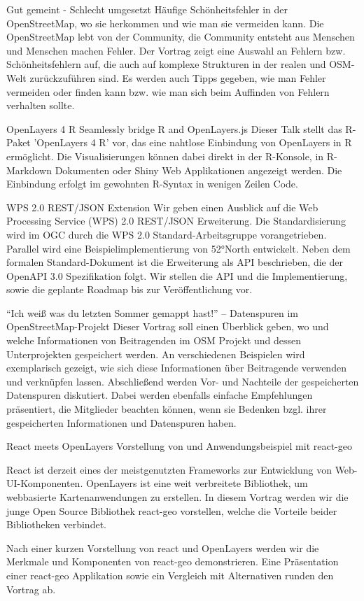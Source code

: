 
%
{Gut gemeint - Schlecht umgesetzt}%
{Häufige Schönheitsfehler in der OpenStreetMap, wo sie herkommen und wie man sie vermeiden kann.}%
{%
Die OpenStreetMap lebt von der Community, die Community entsteht aus Menschen und Menschen machen Fehler. Der Vortrag zeigt eine Auswahl an Fehlern bzw. Schönheitsfehlern auf, die auch auf komplexe Strukturen in der realen und OSM-Welt zurückzuführen sind. Es werden auch Tipps gegeben, wie man Fehler vermeiden oder finden kann bzw. wie man sich beim Auffinden von Fehlern verhalten sollte.%
}

%
{OpenLayers 4 R}%
{Seamlessly bridge R and OpenLayers.js}%
{%
Dieser Talk stellt das R-Paket 'OpenLayers 4 R' vor, das eine nahtlose Einbindung von OpenLayers in R ermöglicht. Die Visualisierungen können dabei direkt in der R-Konsole, in R-Markdown Dokumenten oder Shiny Web Applikationen angezeigt werden. Die Einbindung erfolgt im gewohnten R-Syntax in wenigen Zeilen Code.%
}

%
{WPS 2.0 REST/JSON Extension}%
{}%
{%
Wir geben einen Ausblick auf die Web Processing Service (WPS) 2.0 REST/JSON Erweiterung. Die Standardisierung wird im OGC durch die WPS 2.0 Standard-Arbeitsgruppe vorangetrieben. Parallel wird eine Beispielimplementierung von 52°North entwickelt. Neben dem formalen Standard-Dokument ist die Erweiterung als API beschrieben, die der OpenAPI 3.0 Spezifikation folgt. Wir stellen die API und die Implementierung, sowie die geplante Roadmap bis zur Veröffentlichung vor.%
}

%
{"`Ich weiß was du letzten Sommer gemappt hast!"' -- Datenspuren im OpenStreetMap-Projekt}%
{}%
{%
Dieser Vortrag soll einen Überblick geben, wo und welche Informationen von Beitragenden im OSM Projekt und dessen Unterprojekten gespeichert werden. An verschiedenen Beispielen wird exemplarisch gezeigt, wie sich diese Informationen über Beitragende verwenden und verknüpfen lassen. Abschließend werden Vor- und Nachteile der gespeicherten Datenspuren diskutiert. Dabei werden ebenfalls einfache Empfehlungen präsentiert, die Mitglieder beachten können, wenn sie Bedenken bzgl. ihrer gespeicherten Informationen und Datenspuren haben.%
}

%
{React meets OpenLayers}%
{Vorstellung von und Anwendungsbeispiel mit react-geo}%
{%
React ist derzeit eines der meistgenutzten Frameworks zur Entwicklung von
Web-UI-Komponenten. OpenLayers ist eine weit verbreitete Bibliothek, um
webbasierte Kartenanwendungen zu erstellen. In diesem Vortrag werden wir die
junge Open Source Bibliothek react-geo vorstellen, welche die Vorteile beider 
Bibliotheken verbindet.

Nach einer kurzen Vorstellung von react und OpenLayers werden wir die Merkmale
und Komponenten von react-geo demonstrieren. Eine Präsentation einer react-geo 
Applikation sowie ein Vergleich mit Alternativen runden den Vortrag ab.%
}


